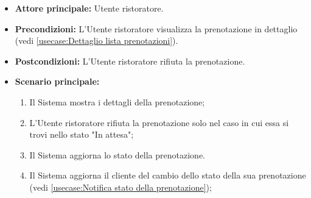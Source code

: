 \label{usecase:Rifiuta prenotazione}
\begin{itemize}
	\item \textbf{Attore principale:} Utente ristoratore.

	\item \textbf{Precondizioni:} L'Utente ristoratore visualizza la prenotazione in dettaglio (vedi \autoref{usecase:Dettaglio lista prenotazioni}).

	\item \textbf{Postcondizioni:} L'Utente ristoratore rifiuta la prenotazione.


	\item \textbf{Scenario principale:}
	      \begin{enumerate}
		      \item Il Sistema mostra i dettagli della prenotazione;
		      \item L'Utente ristoratore rifiuta la prenotazione solo nel caso in cui essa si trovi nello stato "In attesa";
		      \item Il Sistema aggiorna lo stato della prenotazione.
		      \item Il Sistema aggiorna il cliente del cambio dello stato della sua prenotazione (vedi \autoref{usecase:Notifica stato della prenotazione});

	      \end{enumerate}
\end{itemize}
